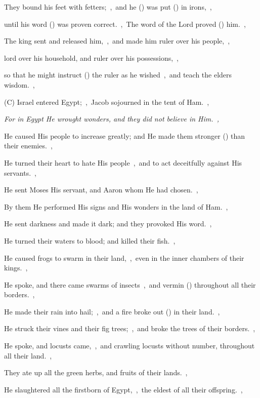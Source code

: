 \documentclass[12pt,twoside,a5paper]{article}
\begin{document}
\begin{normalparskip}
  They bound his feet with fetters;~\sep\ and he () was put () in irons,~\sep

  until his word () was proven correct.~\sep\ The word of the Lord proved () him.~\sep

  The king sent and released him,~\sep\ and made him ruler over his people,~\sep

  lord over his household, and ruler over his possessions,~\sep

  so that he might instruct () the ruler as he wished~\sep\ and teach the elders wisdom.~\sep

  (C) Israel entered Egypt;~\sep\ Jacob sojourned in the tent of Ham.~\sep

  \emph{For in Egypt He wrought wonders, and they did not believe in Him.~\sep}

  He caused His people to increase greatly; and He made them stronger () than their enemies.~\sep

  He turned their heart to hate His people~\sep\ and to act deceitfully against His servants.~\sep

  He sent Moses His servant, and Aaron whom He had chosen.~\sep

  By them He performed His signs and His wonders in the land of Ham.~\sep

  He sent darkness and made it dark; and they provoked His word.~\sep

  He turned their waters to blood; and killed their fish.~\sep

  He caused frogs to swarm in their land,~\sep\ even in the inner chambers of their kings.~\sep

  He spoke, and there came swarms of insects~\sep\ and vermin () throughout all their borders.~\sep

  He made their rain into hail;~\sep\ and a fire broke out () in their land.~\sep

  He struck their vines and their fig trees;~\sep\ and broke the trees of their borders.~\sep

  He spoke, and locusts came,~\sep\ and crawling locusts without number, throughout all their land.~\sep

  They ate up all the green herbs, and fruits of their lands.~\sep

  He slaughtered all the firstborn of Egypt,~\sep\ the eldest of all their offspring.~\sep


\end{normalparskip}
\end{document}
